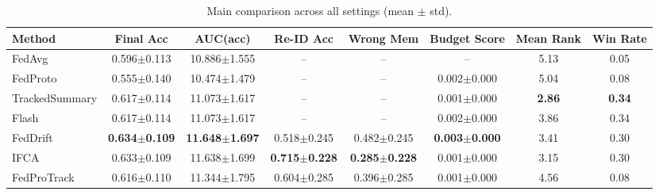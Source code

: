 \begin{table}[t]
\centering
\caption{Main comparison across all settings (mean $\pm$ std).}
\label{tab:main}
\begin{tabular}{lccccccc}
\toprule
Method & Final Acc & AUC(acc) & Re-ID Acc & Wrong Mem & Budget Score & Mean Rank & Win Rate \\
\midrule
FedAvg & 0.596$\pm$0.113 & 10.886$\pm$1.555 & -- & -- & -- & 5.13 & 0.05 \\
FedProto & 0.555$\pm$0.140 & 10.474$\pm$1.479 & -- & -- & 0.002$\pm$0.000 & 5.04 & 0.08 \\
TrackedSummary & 0.617$\pm$0.114 & 11.073$\pm$1.617 & -- & -- & 0.001$\pm$0.000 & \textbf{2.86} & \textbf{0.34} \\
Flash & 0.617$\pm$0.114 & 11.073$\pm$1.617 & -- & -- & 0.002$\pm$0.000 & 3.86 & 0.34 \\
FedDrift & \textbf{0.634$\pm$0.109} & \textbf{11.648$\pm$1.697} & 0.518$\pm$0.245 & 0.482$\pm$0.245 & \textbf{0.003$\pm$0.000} & 3.41 & 0.30 \\
IFCA & 0.633$\pm$0.109 & 11.638$\pm$1.699 & \textbf{0.715$\pm$0.228} & \textbf{0.285$\pm$0.228} & 0.001$\pm$0.000 & 3.15 & 0.30 \\
FedProTrack & 0.616$\pm$0.110 & 11.344$\pm$1.795 & 0.604$\pm$0.285 & 0.396$\pm$0.285 & 0.001$\pm$0.000 & 4.56 & 0.08 \\
\bottomrule
\end{tabular}
\end{table}
